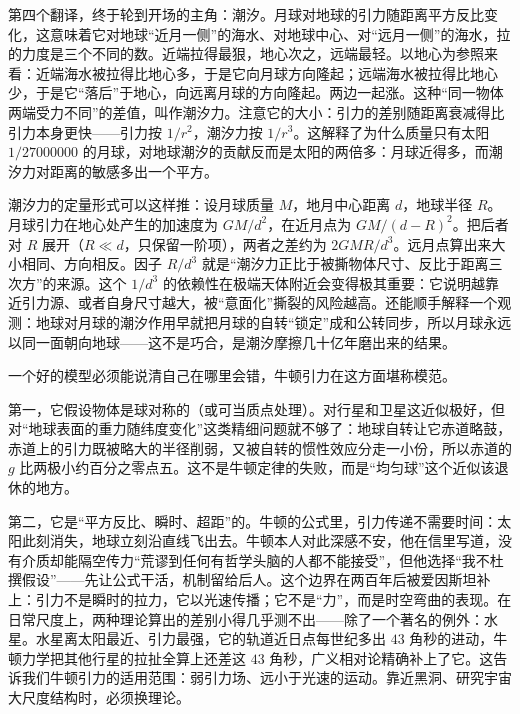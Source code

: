 第四个翻译，终于轮到开场的主角：潮汐。月球对地球的引力随距离平方反比变化，这意味着它对地球“近月一侧”的海水、对地球中心、对“远月一侧”的海水，拉的力度是三个不同的数。近端拉得最狠，地心次之，远端最轻。以地心为参照来看：近端海水被拉得比地心多，于是它向月球方向隆起；远端海水被拉得比地心少，于是它“落后”于地心，向远离月球的方向隆起。两边一起涨。这种“同一物体两端受力不同”的差值，叫作潮汐力。注意它的大小：引力的差别随距离衰减得比引力本身更快——引力按 \(1/r^{2}\)，潮汐力按 \(1/r^{3}\)。这解释了为什么质量只有太阳 \(1/27000000\) 的月球，对地球潮汐的贡献反而是太阳的两倍多：月球近得多，而潮汐力对距离的敏感多出一个平方。

\begin{challenge}
潮汐力的定量形式可以这样推：设月球质量 \(M\)，地月中心距离 \(d\)，地球半径 \(R\)。月球引力在地心处产生的加速度为 \(GM/d^{2}\)，在近月点为 \(GM/(d-R)^{2}\)。把后者对 \(R\) 展开（\(R \ll d\)，只保留一阶项），两者之差约为 \(2GMR/d^{3}\)。远月点算出来大小相同、方向相反。因子 \(R/d^{3}\) 就是“潮汐力正比于被撕物体尺寸、反比于距离三次方”的来源。这个 \(1/d^{3}\) 的依赖性在极端天体附近会变得极其重要：它说明越靠近引力源、或者自身尺寸越大，被“意面化”撕裂的风险越高。还能顺手解释一个观测：地球对月球的潮汐作用早就把月球的自转“锁定”成和公转同步，所以月球永远以同一面朝向地球——这不是巧合，是潮汐摩擦几十亿年磨出来的结果。
\end{challenge}


一个好的模型必须能说清自己在哪里会错，牛顿引力在这方面堪称模范。

第一，它假设物体是球对称的（或可当质点处理）。对行星和卫星这近似极好，但对“地球表面的重力随纬度变化”这类精细问题就不够了：地球自转让它赤道略鼓，赤道上的引力既被略大的半径削弱，又被自转的惯性效应分走一小份，所以赤道的 \(g\) 比两极小约百分之零点五。这不是牛顿定律的失败，而是“均匀球”这个近似该退休的地方。

第二，它是“平方反比、瞬时、超距”的。牛顿的公式里，引力传递不需要时间：太阳此刻消失，地球立刻沿直线飞出去。牛顿本人对此深感不安，他在信里写道，没有介质却能隔空传力“荒谬到任何有哲学头脑的人都不能接受”，但他选择“我不杜撰假设”——先让公式干活，机制留给后人。这个边界在两百年后被爱因斯坦补上：引力不是瞬时的拉力，它以光速传播；它不是“力”，而是时空弯曲的表现。在日常尺度上，两种理论算出的差别小得几乎测不出——除了一个著名的例外：水星。水星离太阳最近、引力最强，它的轨道近日点每世纪多出 \(43\) 角秒的进动，牛顿力学把其他行星的拉扯全算上还差这 \(43\) 角秒，广义相对论精确补上了它。这告诉我们牛顿引力的适用范围：弱引力场、远小于光速的运动。靠近黑洞、研究宇宙大尺度结构时，必须换理论。

